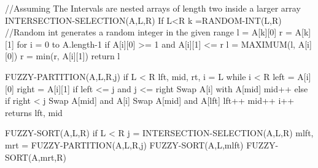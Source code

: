 //Assuming The Intervals are nested arrays of length two inside a larger array
INTERSECTION-SELECTION(A,L,R)
	If L<R
		k =RANDOM-INT(L,R) //Random int generates a random integer in the given range
		l = A[k][0]
		r = A[k][1]
		for i = 0 to A.length-1
			if A[i][0] >= 1 and A[i][1] <= r
				l = MAXIMUM(l, A[i][0])
				r = min(r, A[i][1])
		return l

FUZZY-PARTITION(A,L,R,j)
	if L < R
		lft, mid, rt, i = L
		while i < R
			left = A[i][0]
			right = A[i][1]
			if left <= j and j <= right
				Swap A[i] with A[mid]
				mid++
			else if right < j
				Swap A[mid] and A[i]
				Swap A[mid] and A[lft]
				lft++
				mid++
			i++
	returns lft, mid

FUZZY-SORT(A,L,R)
	if L < R
		j = INTERSECTION-SELECTION(A,L,R)
		mlft, mrt = FUZZY-PARTITION(A,L,R,j)
		FUZZY-SORT(A,L,mlft)
		FUZZY-SORT(A,mrt,R)